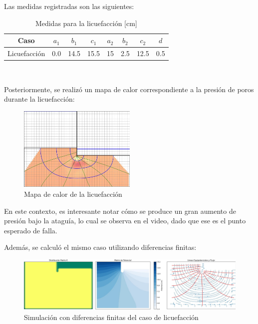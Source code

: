 Las medidas registradas son las siguientes:

\begin{table}[H]
    \centering
    \caption{Medidas para la licuefacción [cm]}
    \begin{tabular}{|c|c|c|c|c|c|c|c|}
    \hline
    Caso & $a_1$ & $b_1$ & $c_1$ & $a_2$ & $b_2$ & $c_2$ & $d$ \\ \hline
    Licuefacción & 0.0 & 14.5 & 15.5 & 15 & 2.5 & 12.5 & 0.5 \\ \hline
    \end{tabular}\\
    \label{tab:medidas1}
\end{table}

Posteriormente, se realizó un mapa de calor correspondiente a la presión de poros durante la licuefacción:

\begin{figure}[H]
    \centering
    \includegraphics[width=0.5\textwidth]{GRAFICOS/caso_licuefaccion_presion_poros.jpg}
    \caption{Mapa de calor de la licuefacción}
    \label{fig:maqueta_licuefaccion}
\end{figure}

En este contexto, es interesante notar cómo se produce un gran aumento de presión bajo la ataguía, lo cual se observa en el video, dado que ese es el punto esperado de falla.

Además, se calculó el mismo caso utilizando diferencias finitas:

\begin{figure}[H]
    \centering
    \includegraphics[width=1\textwidth]{GRAFICOS/laplace_caso_licuefaccion_escala_cm.jpg}
    \caption{Simulación con diferencias finitas del caso de licuefacción}
    \label{fig:maqueta_licuefaccion_diferencias_finitas}
\end{figure}

